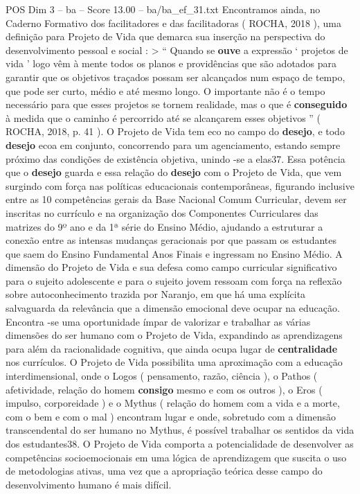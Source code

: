 \begin{textsample}{POS Dim 3 – ba – Score 13.00 – ba/ba\_ef\_31.txt}
Encontramos ainda, no Caderno Formativo dos facilitadores e das facilitadoras ( ROCHA, 2018 ), uma definição para Projeto de Vida que demarca sua inserção na perspectiva do desenvolvimento pessoal e social : > “ Quando se \textbf{ouve} a expressão ‘ projetos de vida ’ logo vêm à mente todos os planos e providências que são adotados para garantir que os objetivos traçados possam ser alcançados num espaço de tempo, que pode ser curto, médio e até mesmo longo.
O importante não é o tempo necessário para que esses projetos se tornem realidade, mas o que é \textbf{conseguido} à medida que o caminho é percorrido até se alcançarem esses objetivos ” ( ROCHA, 2018, p. 41 ).
O Projeto de Vida tem eco no campo do \textbf{desejo}, e todo \textbf{desejo} ecoa em conjunto, concorrendo para um agenciamento, estando sempre próximo das condições de existência objetiva, unindo -se a elas37.
Essa potência que o \textbf{desejo} guarda e essa relação do \textbf{desejo} com o Projeto de Vida, que vem surgindo com força nas políticas educacionais contemporâneas, figurando inclusive entre as 10 competências gerais da Base Nacional Comum Curricular, devem ser inscritas no currículo e na organização dos Componentes Curriculares das matrizes do 9º ano e da 1ª série do Ensino Médio, ajudando a estruturar a conexão entre as intensas mudanças geracionais por que passam os estudantes que saem do Ensino Fundamental Anos Finais e ingressam no Ensino Médio.
A dimensão do Projeto de Vida e sua defesa como campo curricular significativo para o sujeito adolescente e para o sujeito jovem ressoam com força na reflexão sobre autoconhecimento trazida por Naranjo, em que há uma explícita salvaguarda da relevância que a dimensão emocional deve ocupar na educação.
Encontra -se uma oportunidade ímpar de valorizar e trabalhar as várias dimensões do ser humano com o Projeto de Vida, expandindo as aprendizagens para além da racionalidade cognitiva, que ainda ocupa lugar de \textbf{centralidade} nos currículos.
O Projeto de Vida possibilita uma aproximação com a educação interdimensional, onde o Logos ( pensamento, razão, ciência ), o Pathos ( afetividade, relação do homem \textbf{consigo} mesmo e com os outros ), o Eros ( impulso, corporeidade ) e o Mythus ( relação do homem com a vida e a morte, com o bem e com o mal ) encontram lugar e onde, sobretudo com a dimensão transcendental do ser humano no Mythus, é possível trabalhar os sentidos da vida dos estudantes38.
O Projeto de Vida comporta a potencialidade de desenvolver as competências socioemocionais em uma lógica de aprendizagem que suscita o uso de metodologias ativas, uma vez que a apropriação teórica desse campo do desenvolvimento humano é mais difícil.

\end{textsample}
